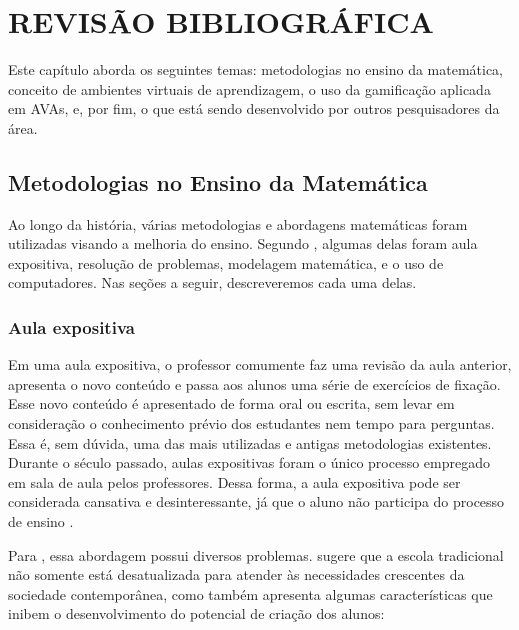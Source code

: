 \section{REVISÃO BIBLIOGRÁFICA}

Este capítulo aborda os seguintes temas: metodologias no ensino da matemática, conceito de ambientes virtuais de aprendizagem, o uso da gamificação aplicada em AVAs, e, por fim, o que está sendo 
desenvolvido por outros pesquisadores da área.

\subsection{Metodologias no Ensino da Matemática}

Ao longo da história, várias metodologias e abordagens matemáticas foram utilizadas visando a melhoria do ensino. Segundo , algumas delas foram aula expositiva, 
resolução de problemas, modelagem matemática, e o uso de computadores. Nas seções a seguir, descreveremos cada uma delas.

\subsubsection{Aula expositiva}

Em uma aula expositiva, o professor comumente faz uma revisão da aula anterior, apresenta o novo conteúdo e passa aos alunos uma série de exercícios de fixação. Esse novo conteúdo é apresentado de 
forma oral ou escrita, sem levar em consideração o conhecimento prévio dos estudantes nem tempo para perguntas. Essa é, sem dúvida, uma das mais utilizadas e antigas metodologias existentes. Durante 
o século passado, aulas expositivas foram o único processo empregado em sala de aula pelos professores. Dessa forma, a aula expositiva pode ser considerada cansativa e desinteressante, já que o aluno 
não participa do processo de ensino  \cite{hammes2003tendencias}.

Para , essa abordagem possui diversos problemas.  sugere que a escola tradicional não somente está desatualizada para atender às necessidades 
crescentes da sociedade contemporânea, como também apresenta algumas características que inibem o desenvolvimento do potencial de criação dos alunos:

